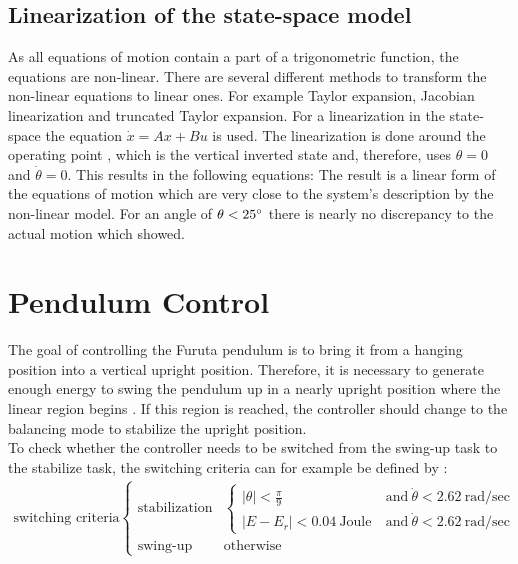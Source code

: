 \subsection{Linearization of the state-space model}
As all equations of motion contain a part of a trigonometric function, the 
equations are non-linear. There are several different methods to transform the 
non-linear equations to linear ones. For example Taylor expansion, Jacobian 
linearization and truncated Taylor expansion. %
 For a linearization in the state-space the equation 
$\dot{x}=Ax+Bu$ is used. The linearization is done around the 
operating point \citep{rigatos2018nonlinear}, which is the vertical inverted 
state and, therefore, uses $\theta = 0$ and $\dot{\theta}=0$. This results in 
the following equations: %
The result is a linear form of the equations of motion which are very close to 
the system's description by the non-linear model. For an angle of 
$\theta<25\degree$  
there is nearly no discrepancy to the actual motion
which \cite{kurode2011swing} showed.

\section{Pendulum Control}
The goal of controlling the Furuta pendulum is to bring it from a hanging 
position into a vertical upright position. Therefore, it is necessary to 
generate enough energy to swing the pendulum up in a nearly upright position 
where the linear region begins \citep{kurode2011swing}. If this region is 
reached, the controller should change to the balancing mode to stabilize the 
upright position.\\
To check whether the controller needs to be switched from the swing-up task to 
the stabilize task, the switching criteria can for 
example be defined by \citep{hamza2019current}:
\begin{align*}
\text{switching criteria}
\begin{cases} \text{stabilization} &\begin{cases}
|\theta|< \frac{\pi}{9} \ &\text{and}\  \dot{\theta} < 2.62\  \text{rad/sec}\\
|E-E_r|< 0.04 \ \text{Joule}\ &\text{and}\  \dot{\theta} < 2.62\  \text{rad/sec}
\end{cases}\\
\text{swing-up} & \text{otherwise}
\end{cases}
\end{align*}
